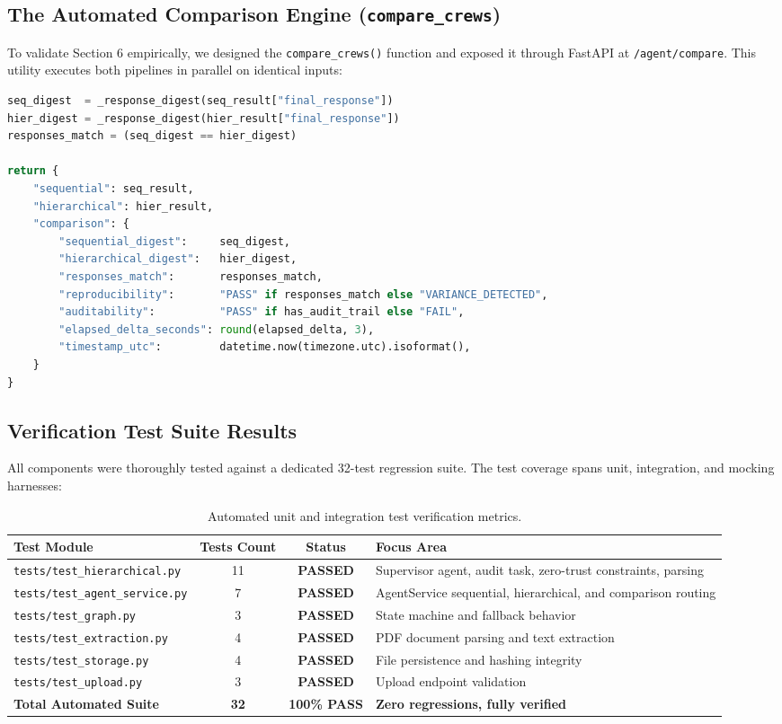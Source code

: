 \documentclass[10pt,a4paper]{article}
\begin{document}
\subsection{The Automated Comparison Engine (\texttt{compare\_crews})}
To validate Section 6 empirically, we designed the \texttt{compare\_crews()} function and exposed it through FastAPI at \texttt{/agent/compare}. This utility executes both pipelines in parallel on identical inputs:
\begin{lstlisting}[language=Python]
seq_digest  = _response_digest(seq_result["final_response"])
hier_digest = _response_digest(hier_result["final_response"])
responses_match = (seq_digest == hier_digest)

return {
    "sequential": seq_result,
    "hierarchical": hier_result,
    "comparison": {
        "sequential_digest":     seq_digest,
        "hierarchical_digest":   hier_digest,
        "responses_match":       responses_match,
        "reproducibility":       "PASS" if responses_match else "VARIANCE_DETECTED",
        "auditability":          "PASS" if has_audit_trail else "FAIL",
        "elapsed_delta_seconds": round(elapsed_delta, 3),
        "timestamp_utc":         datetime.now(timezone.utc).isoformat(),
    }
}
\end{lstlisting}

\subsection{Verification Test Suite Results}
All components were thoroughly tested against a dedicated 32-test regression suite. The test coverage spans unit, integration, and mocking harnesses:

\begin{table}[htbp]
\centering
\small
\begin{tabularx}{0.85\textwidth}{l c c X}
\toprule
\textbf{Test Module} & \textbf{Tests Count} & \textbf{Status} & \textbf{Focus Area} \\
\midrule
\texttt{tests/test\_hierarchical.py} & 11 & \textbf{PASSED} & Supervisor agent, audit task, zero-trust constraints, parsing \\
\texttt{tests/test\_agent\_service.py} & 7 & \textbf{PASSED} & AgentService sequential, hierarchical, and comparison routing \\
\texttt{tests/test\_graph.py} & 3 & \textbf{PASSED} & State machine and fallback behavior \\
\texttt{tests/test\_extraction.py} & 4 & \textbf{PASSED} & PDF document parsing and text extraction \\
\texttt{tests/test\_storage.py} & 4 & \textbf{PASSED} & File persistence and hashing integrity \\
\texttt{tests/test\_upload.py} & 3 & \textbf{PASSED} & Upload endpoint validation \\
\midrule
\textbf{Total Automated Suite} & \textbf{32} & \textbf{100\% PASS} & \textbf{Zero regressions, fully verified} \\
\bottomrule
\end{tabularx}
\caption{Automated unit and integration test verification metrics.}
\label{tab:test_results}
\end{table}
\end{document}
